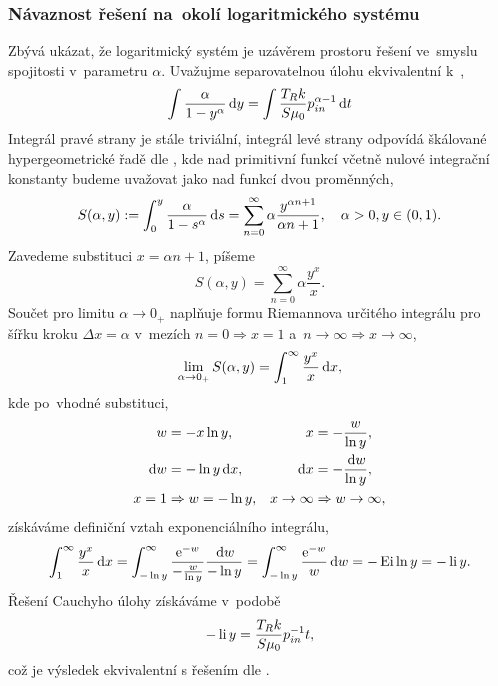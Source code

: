 \subsubsection{Návaznost řešení na~okolí logaritmického systému}\label{sss:navaznost_reseni_na_okoli_logaritmickeho_systemu}
Zbývá ukázat, že logaritmický systém je uzávěrem prostoru řešení ve~smyslu spojitosti v~parametru $\alpha$. Uvažujme separovatelnou úlohu ekvivalentní k~,
\begin{equation}
    \int\frac{\alpha}{1-y^{\alpha}} \,\mathrm{d}{y} =\int\frac{T_R k}{S \mu_0}p_{in}^{\alpha-1}\,\mathrm{d}{t}
\end{equation}
Integrál pravé strany je stále triviální, integrál levé strany odpovídá škálované hypergeometrické řadě dle , kde nad primitivní funkcí včetně nulové integrační konstanty budeme uvažovat jako nad funkcí dvou proměnných,
\begin{equation}
    S(\alpha, y):=\int_0^{y}\frac{\alpha}{1-s^{\alpha}} \,\mathrm{d}{s}=\sum_{n=0}^{\infty}\alpha\frac{y^{\alpha n+1}}{\alpha n+1}, \quad \alpha > 0, y\in(0,1).
\end{equation}
Zavedeme substituci $x=\alpha n+1$, píšeme
\begin{equation}
    S(\alpha, y)=\sum_{n=0}^{\infty}\alpha \frac{y^{x}}{x}.
\end{equation}
Součet pro limitu $\alpha \to 0_+$ naplňuje formu Riemannova určitého integrálu pro šířku kroku $\Delta x = \alpha$ v~mezích $n=0\Rightarrow x=1$ a~$n\to\infty\Longrightarrow x\to\infty$,
\begin{equation}
    \lim_{\alpha\to 0_+}S(\alpha,y)=\int_1^\infty\frac{y^x}{x}\,\mathrm{d}{x},
\end{equation}
kde po~vhodné substituci,
\begin{subequations}
\begin{align}
    w&=-x \ln y,& x&=-\frac{w}{\ln y},\\
    \,\mathrm{d}{w}&=-\ln y \,\mathrm{d}{x},& \,\mathrm{d}{x}&=-\frac{\,\mathrm{d}{w}}{\ln{y}},\\
    x=1&\Rightarrow w=-\ln y,& x\to\infty &\Rightarrow w\to \infty,
\end{align}
\end{subequations}
získáváme definiční vztah exponenciálního integrálu,
\begin{equation}
    \int_1^\infty\frac{y^x}{x}\,\mathrm{d}{x}=\int_{-\ln{y}}^{\infty}\frac{\mathrm{e}^{-w}}{-\frac{w}{\ln{y}}}\frac{\,\mathrm{d}{w}}{-\ln{y}}=\int_{-\ln{y}}^{\infty}\frac{\mathrm{e}^{-w}}{w}\,\mathrm{d}{w}=-\operatorname{Ei}\ln{y}=-\operatorname{li} y.
\end{equation}
Řešení Cauchyho úlohy získáváme v~podobě
\begin{equation}
    -\operatorname{li} y = \frac{T_R k}{S \mu_0} p_{in}^{-1}t,
\end{equation}
což je výsledek ekvivalentní s řešením dle .

